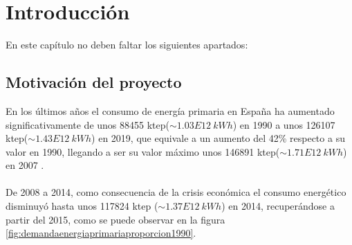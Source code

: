 \chapter{Introducción}

En este capítulo no deben faltar los siguientes apartados:

\section{Motivación del proyecto}

En los últimos años el consumo de energía primaria en España ha aumentado significativamente de unos 88455 ktep($\sim1.03E12 \ kWh$) en 1990 a unos 126107 ktep($\sim 1.43E12 \ kWh$) en 2019, que equivale a un aumento del 42\% respecto a su valor en 1990, llegando a ser su valor máximo unos 146891 ktep($\sim 1.71E12 \ kWh$) en 2007 \cite{libroEnergiaEnEspana2019}.\\\\
De 2008 a 2014, como consecuencia de la crisis económica el consumo energético disminuyó hasta unos 117824 ktep ($\sim 1.37E12 \ kWh$) en 2014, recuperándose a partir del 2015, como se puede observar en la figura \ref{fig:demandaenergiaprimariaproporcion1990}. \\


